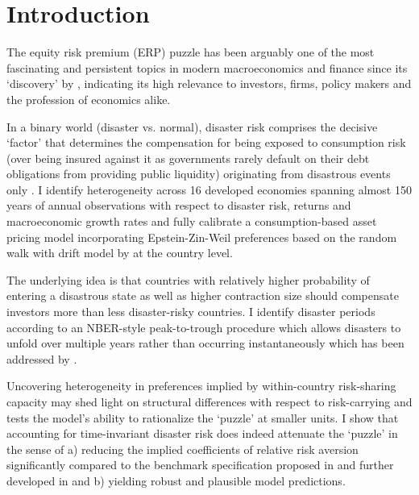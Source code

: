 \section{Introduction} \label{introduction}

The equity risk premium (ERP) puzzle has been arguably one of the most fascinating and persistent topics in modern macroeconomics and finance since its `discovery' by \citet{Mehra1985}, indicating its high relevance to investors, firms, policy makers and the profession of economics alike.

In a binary world (disaster vs. normal), disaster risk \cite{Rietz1988} comprises the decisive `factor' that determines the compensation for being exposed to consumption risk (over being insured against it as governments rarely default on their debt obligations from providing public liquidity) originating from disastrous events only \cite{Nakamura2013}. %
I identify heterogeneity across 16 developed economies spanning almost 150 years of annual observations with respect to disaster risk, returns and macroeconomic growth rates and fully calibrate a consumption-based asset pricing model incorporating Epstein-Zin-Weil preferences based on the random walk with drift model by \citet{Barro2006} at the country level. 

The underlying idea is that countries with relatively higher probability of entering a disastrous state as well as higher contraction size should compensate investors more than less disaster-risky countries. I identify disaster periods according to an NBER-style peak-to-trough procedure which allows disasters to unfold over multiple years rather than occurring instantaneously which has been addressed by \citet{Julliard2012}.

Uncovering heterogeneity in preferences implied by within-country risk-sharing capacity may shed light on structural differences with respect to risk-carrying and tests the model's ability to rationalize the `puzzle' at smaller units. I show that accounting for time-invariant disaster risk does indeed attenuate the `puzzle' in the sense of a) reducing the implied coefficients of relative risk aversion significantly compared to the benchmark specification proposed in \citet{Mehra1985} and further developed in \citet{Mehra2003} and b) yielding robust and plausible model predictions. 

